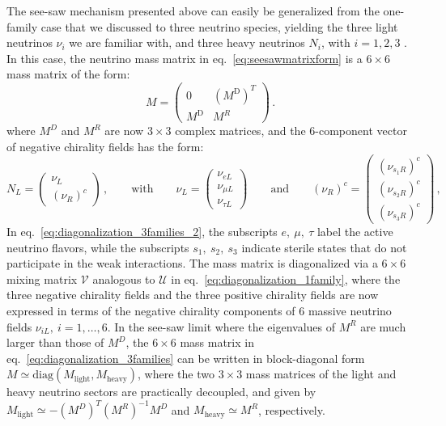 The see-saw mechanism presented above can easily be generalized from the one-family case that we discussed to three neutrino species, yielding the three light neutrinos $\nu_i$ we are familiar with, and three heavy neutrinos $N_i$, with $i=1,2,3$ \cite{Giunti:2003qt}. In this case, the neutrino mass matrix in eq.~\ref{eq:seesawmatrixform} is a $6\times6$ mass matrix of the form:
%
\begin{equation}
M
=
\begin{pmatrix}
0 & (M^{\text{D}})^T
\\ \displaystyle
M^{\text{D}} & M^R
\end{pmatrix}
\,.
\label{eq:diagonalization_3families}
\end{equation}
%
\noindent where $M^D$ and $M^R$ are now $3\times3$ complex matrices, and the 6-component vector of negative chirality fields has the form:
%
\begin{equation}
N_L
=
\begin{pmatrix}
\nu_L
\\ \displaystyle
(\nu_R)^c
\end{pmatrix}
\,,
\qquad
\text{with}
\qquad
\nu_L
=
\begin{pmatrix}
\nu_{eL}
\\ \displaystyle
\nu_{{\mu}L}
\\ \displaystyle
\nu_{{\tau}L}
\end{pmatrix}
\qquad
\text{and}
\qquad
(\nu_R)^c
=
\begin{pmatrix}
(\nu_{s_1 R})^c
\\ \displaystyle
(\nu_{s_2 R})^c
\\ \displaystyle
(\nu_{s_3 R})^c
\end{pmatrix}
\,,
\label{eq:diagonalization_3families_2}
\end{equation}
%
In eq.~\ref{eq:diagonalization_3families_2}, the subscripts $e,\ \mu,\ \tau$ label the active neutrino flavors, while the subscripts $s_1,\ s_2,\ s_3$ indicate sterile states that do not participate in the weak interactions. The mass matrix is diagonalized via a $6\times6$ mixing matrix $\mathcal{V}$ analogous to $\mathcal{U}$ in eq.~\ref{eq:diagonalization_1family}, where the three negative chirality fields and the three positive chirality fields are now expressed in terms of the negative chirality components of 6 massive neutrino fields $\nu_{iL},\ i=1,\ldots ,6$. In the see-saw limit where the eigenvalues of $M^R$ are much larger than those of $M^D$, the $6\times6$ mass matrix in eq.~\ref{eq:diagonalization_3families} can be written in block-diagonal form $M\simeq \text{diag}(M_{\text{light}},M_{\text{heavy}})$, where the two $3\times3$ mass matrices of the light and heavy neutrino sectors are practically decoupled, and given by $M_{\text{light}}\simeq -(M^D)^T(M^R)^{-1}M^D$ and $M_{\text{heavy}}\simeq M^R$, respectively. 

